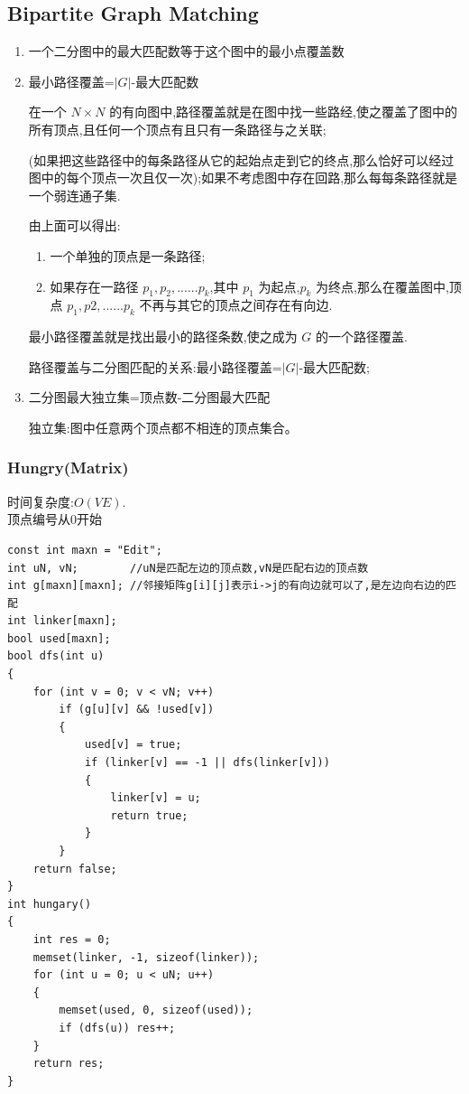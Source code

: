 \documentclass[twoside]{article}
\begin{document}
\subsection{Bipartite Graph Matching}
\begin{enumerate}
\item 一个二分图中的最大匹配数等于这个图中的最小点覆盖数

\item 最小路径覆盖=$|G|$-最大匹配数

在一个 $N \times N$ 的有向图中,路径覆盖就是在图中找一些路经,使之覆盖了图中的所有顶点,且任何一个顶点有且只有一条路径与之关联;

(如果把这些路径中的每条路径从它的起始点走到它的终点,那么恰好可以经过图中的每个顶点一次且仅一次);如果不考虑图中存在回路,那么每每条路径就是一个弱连通子集.

由上面可以得出:

\begin{enumerate}
\item 一个单独的顶点是一条路径;

\item 如果存在一路径 $p_1,p_2,......p_k$,其中 $p_1$ 为起点,$p_k$ 为终点,那么在覆盖图中,顶点 $p_1,p2,......p_k$ 不再与其它的顶点之间存在有向边.
\end{enumerate}

最小路径覆盖就是找出最小的路径条数,使之成为 $G$ 的一个路径覆盖.

路径覆盖与二分图匹配的关系:最小路径覆盖=$|G|$-最大匹配数;

\item 二分图最大独立集=顶点数-二分图最大匹配

独立集:图中任意两个顶点都不相连的顶点集合。
\end{enumerate}
\subsubsection{Hungry(Matrix)}

时间复杂度:$O(VE)$.\\
顶点编号从0开始
\begin{lstlisting}
const int maxn = "Edit";
int uN, vN;        //uN是匹配左边的顶点数,vN是匹配右边的顶点数
int g[maxn][maxn]; //邻接矩阵g[i][j]表示i->j的有向边就可以了,是左边向右边的匹配
int linker[maxn];
bool used[maxn];
bool dfs(int u)
{
    for (int v = 0; v < vN; v++)
        if (g[u][v] && !used[v])
        {
            used[v] = true;
            if (linker[v] == -1 || dfs(linker[v]))
            {
                linker[v] = u;
                return true;
            }
        }
    return false;
}
int hungary()
{
    int res = 0;
    memset(linker, -1, sizeof(linker));
    for (int u = 0; u < uN; u++)
    {
        memset(used, 0, sizeof(used));
        if (dfs(u)) res++;
    }
    return res;
}
\end{lstlisting}
\end{document}
